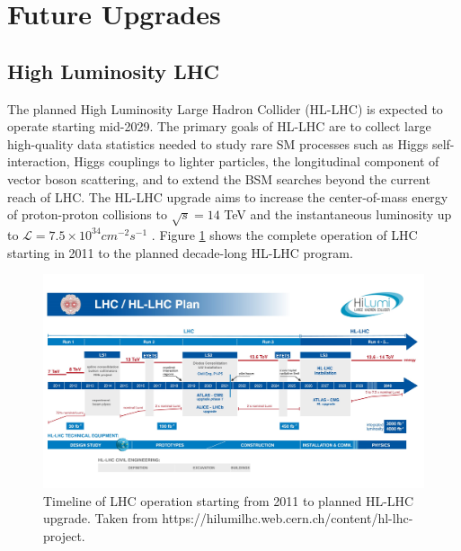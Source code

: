 \section{Future Upgrades}
\label{sec:FutureUpgrades}

\subsection{High Luminosity LHC}
\label{subsec:HLLHC}
The planned High Luminosity Large Hadron Collider (HL-LHC) is expected to operate starting mid-2029. The primary goals of HL-LHC are to collect large high-quality data statistics needed to study rare SM processes such as Higgs self-interaction, Higgs couplings to lighter particles, the longitudinal component of vector boson scattering, and to extend the BSM searches beyond the current reach of LHC. The HL-LHC upgrade aims to increase the center-of-mass energy of proton-proton collisions to $\sqrt{s}=14$ TeV and the instantaneous luminosity up to $\mathcal L = 7.5 \times 10^{34} cm^{-2}s^{-1}$ \cite{HLLHC}. Figure \ref{fig:HLLHC} shows the complete operation of LHC starting in 2011 to the planned decade-long HL-LHC program. 

\begin{figure}
    \centering
    \includegraphics[width=.95\linewidth]{figures/LHC/HLLHCPlan.jpeg}
    \caption{ Timeline of LHC operation starting from 2011 to planned HL-LHC upgrade. Taken from \small{https://hilumilhc.web.cern.ch/content/hl-lhc-project}.\label{fig:HLLHC}}
\end{figure}
\normalsize

